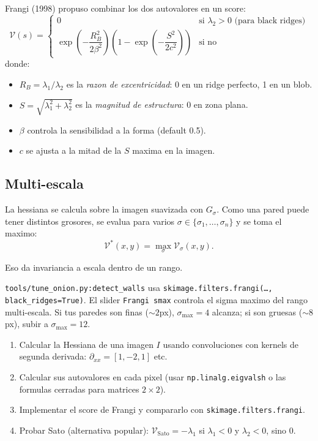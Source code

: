\documentclass[11pt,a4paper,twoside,openright]{book}
\begin{document}
Frangi (1998) propuso combinar los dos autovalores en un score:
\begin{equation}
\mathcal{V}(s) = \begin{cases}
0 & \text{si } \lambda_2 > 0 \text{ (para black ridges)} \\
\exp\!\left(-\dfrac{R_B^2}{2\beta^2}\right) \left(1 - \exp\!\left(-\dfrac{S^2}{2c^2}\right)\right) & \text{si no}
\end{cases}
\end{equation}
donde:
\begin{itemize}[leftmargin=2em]
  \item $R_B = \lambda_1 / \lambda_2$ es la \emph{razon de excentricidad}: 0 en un ridge perfecto, 1 en un blob.
  \item $S = \sqrt{\lambda_1^2 + \lambda_2^2}$ es la \emph{magnitud de estructura}: 0 en zona plana.
  \item $\beta$ controla la sensibilidad a la forma (default 0.5).
  \item $c$ se ajusta a la mitad de la $S$ maxima en la imagen.
\end{itemize}

\subsection{Multi-escala}

La hessiana se calcula sobre la imagen suavizada con $G_\sigma$. Como una pared puede tener distintos grosores, se evalua para varios $\sigma \in \{\sigma_1, \dots, \sigma_n\}$ y se toma el maximo:
\begin{equation}
\mathcal{V}^*(x,y) = \max_{\sigma} \mathcal{V}_\sigma(x,y).
\end{equation}

Eso da invariancia a escala dentro de un rango.

\begin{pipeline}
\texttt{tools/tune\_onion.py:detect\_walls} usa \texttt{skimage.filters.frangi(\dots, black\_ridges=True)}. El slider \texttt{Frangi smax} controla el sigma maximo del rango multi-escala. Si tus paredes son finas ($\sim 2$px), $\sigma_{\max}=4$ alcanza; si son gruesas ($\sim 8$px), subir a $\sigma_{\max}=12$.
\end{pipeline}

\begin{ejercicio}
\begin{enumerate}[leftmargin=2em]
  \item Calcular la Hessiana de una imagen $I$ usando convoluciones con kernels de segunda derivada: $\partial_{xx} = [1,-2,1]$ etc.
  \item Calcular sus autovalores en cada pixel (usar \texttt{np.linalg.eigvalsh} o las formulas cerradas para matrices $2{\times}2$).
  \item Implementar el score de Frangi y compararlo con \texttt{skimage.filters.frangi}.
  \item Probar Sato (alternativa popular): $\mathcal{V}_{\text{Sato}} = -\lambda_1$ si $\lambda_1 < 0$ y $\lambda_2 < 0$, sino 0.
\end{enumerate}
\end{ejercicio}
\end{document}

